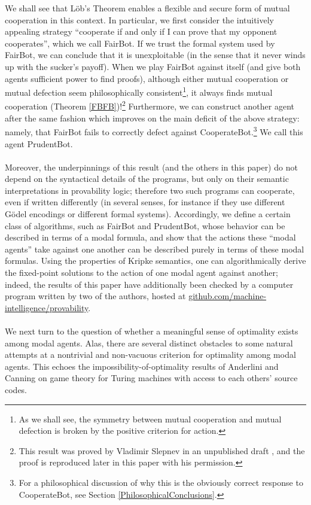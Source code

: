 \documentclass[12pt, letterpaper]{article}
\numberwithin{equation}{section}
\begin{document}
We shall see that L\"{o}b's Theorem enables a flexible and secure form of mutual cooperation in this context. In particular, we first consider the intuitively appealing strategy ``cooperate if and only if I can prove that my opponent cooperates'', which we call FairBot. If we trust the formal system used by FairBot, we can conclude that it is unexploitable (in the sense that it never winds up with the sucker's payoff). When we play FairBot against itself (and give both agents sufficient power to find proofs), although either mutual cooperation or mutual defection seem philosophically consistent\footnote{As we shall see, the symmetry between mutual cooperation and mutual defection is broken by the positive criterion for action.}, it always finds mutual cooperation (Theorem \ref{FBFB})!\footnote{This result was proved by Vladimir Slepnev in an unpublished draft \cite{Slepnev}, and the proof is reproduced later in this paper with his permission.} Furthermore, we can construct another agent after the same fashion which improves on the main deficit of the above strategy: namely, that FairBot fails to correctly defect against CooperateBot.\footnote{For a philosophical discussion of why this is the obviously correct response to CooperateBot, see Section \ref{PhilosophicalConclusions}.} We call this agent PrudentBot.
\\
\\ Moreover, the underpinnings of this result (and the others in this paper) do not depend on the syntactical details of the programs, but only on their semantic interpretations in provability logic; therefore two such programs can cooperate, even if written differently (in several senses, for instance if they use different G\"{o}del encodings or different formal systems). Accordingly, we define a certain class of algorithms, such as FairBot and PrudentBot, whose behavior can be described in terms of a modal formula, and show that the actions these ``modal agents'' take against one another can be described purely in terms of these modal formulas. Using the properties of Kripke semantics, one can algorithmically derive the fixed-point solutions to the action of one modal agent against another; indeed, the results of this paper have additionally been checked by a computer program written by two of the authors, hosted at \url{github.com/machine-intelligence/provability}.
\\
\\ We next turn to the question of whether a meaningful sense of optimality exists among modal agents. Alas, there are several distinct obstacles to some natural attempts at a nontrivial and non-vacuous criterion for optimality among modal agents. This echoes the impossibility-of-optimality results of Anderlini \cite{Anderlini} and Canning \cite{Canning} on game theory for Turing machines with access to each others' source codes.
\end{document}
